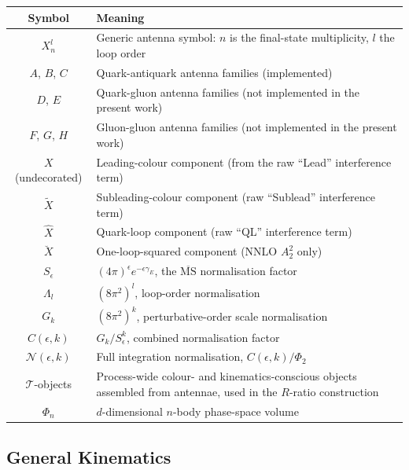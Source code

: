 \begin{longtable}{|c|p{10.5cm}|}
    \hline
    \textbf{Symbol} & \textbf{Meaning} \\
    \hline
    \endhead
    $X_n^l$ & Generic antenna symbol: $n$ is the final-state multiplicity, $l$ the loop order \\ \hline
    $A$, $B$, $C$ & Quark-antiquark antenna families (implemented) \\ \hline
    $D$, $E$ & Quark-gluon antenna families (not implemented in the present work) \\ \hline
    $F$, $G$, $H$ & Gluon-gluon antenna families (not implemented in the present work) \\ \hline
    $X$ (undecorated) & Leading-colour component (from the raw ``Lead'' interference term) \\ \hline
    $\tilde{X}$ & Subleading-colour component (raw ``Sublead'' interference term) \\ \hline
    $\hat{X}$ & Quark-loop component (raw ``QL'' interference term) \\ \hline
    $\breve{X}$ & One-loop-squared component (NNLO $A_2^2$ only) \\ \hline
    $S_\epsilon$ & $(4\pi)^{\epsilon}e^{-\epsilon\gamma_E}$, the $\overline{\text{MS}}$ normalisation factor \\ \hline
    $\Lambda_l$ & $(8\pi^2)^l$, loop-order normalisation \\ \hline
    $G_k$ & $(8\pi^2)^k$, perturbative-order scale normalisation \\ \hline
    $C(\epsilon,k)$ & $G_k/S_\epsilon^k$, combined normalisation factor \\ \hline
    
    $\mathcal N(\epsilon,k)$ & Full integration normalisation, $C(\epsilon,k)/\Phi_2$ \\ \hline
    $\mathcal T$-objects & Process-wide colour- and kinematics-conscious objects assembled from antennae, used in the $R$-ratio construction \\ \hline
    $\Phi_n$ & $d$-dimensional $n$-body phase-space volume \\ \hline
\end{longtable}

\subsection*{General Kinematics}

